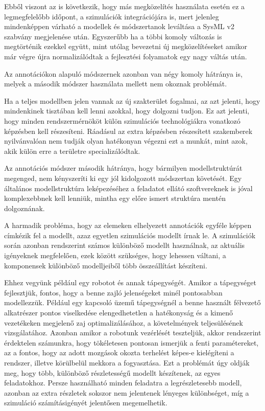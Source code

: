         Ebből viszont az is következik, hogy más megközelítés használata esetén ez a legmegfelelőbb időpont, a szimulációk integrációjára is, mert jelenleg mindenképpen várható a modellek és módszertanok leváltása a SysML v2 szabvány megjelenése után.
        Egyszerűbb ha a többi komoly változás is megtörténik ezekkel együtt, mint utólag bevezetni új megközelítéseket amikor már végre újra normalizálódtak a fejlesztési folyamatok egy nagy váltás után.
        
        Az annotációkon alapuló módszernek azonban van négy komoly hátránya is, melyek a második módszer használata mellett nem okoznak problémát.

        Ha a teljes modellben jelen vannak az új szakterület fogalmai, az azt jelenti, hogy mindenkinek tisztában kell lenni azokkal, hogy dolgozni tudjon.
        Ez azt jelenti, hogy minden rendszermérnököt külön szimulációs technológiákra vonatkozó képzésben kell részesíteni.
        Ráadásul az extra képzésben részesített szakemberek nyilvánvalóan nem tudják olyan hatékonyan végezni ezt a munkát, mint azok, akik külön erre a területre specializálódtak.

        Az annotációs módszer második hátránya, hogy bármilyen modellstruktúrát megenged, nem kényszeríti ki egy jól kidolgozott módszertan követését.
        Egy általános modellstruktúra leképezéséhez a feladatot ellátó szoftvereknek is jóval komplexebbnek kell lenniük, mintha egy előre ismert struktúra mentén dolgoznának.

        A harmadik probléma, hogy az elemeken elhelyezett annotációk egyféle képpen címkézik fel a modellt, azaz egyetlen szimulációs modellt írnak le.
        A szimulációk során azonban rendszerint számos különböző modellt használnak, az aktuális igényeknek megfelelően, ezek között szükséges, hogy lehessen váltani, a komponensek különböző modelljeiből több összeállítást készíteni.
        
        Ehhez vegyünk például egy robotot és annak tápegységét.
        Amikor a tápegységet fejlesztjük, fontos, hogy a benne zajló jelenségeket minél pontosabban modellezzük. Például egy kapcsoló üzemű tápegységnél a benne használt félvezető alkatrészer pontos viselkedése elengedhetetlen a hatékonyság és a kimenő vezetékeken megjelenő zaj optimalizálásához, a követelmények teljesülésének vizsgálatához.
        Azonban amikor a robotunk vezérlését teszteljük, akkor rendszerint érdektelen számunkra, hogy tökéletesen pontosan ismerjük a fenti paramétereket, az a fontos, hogy az adott mozgások okozta terhelést képes-e kielégíteni a rendszer, illetve körülbelül mekkora a fogyasztása.
        Ezt a problémát úgy oldják meg, hogy több, különböző részletességű modellt készítenek, az egyes feladatokhoz.
        Persze használható minden feladatra a legrészletesebb modell, azonban az extra részletek sokszor nem jelentenek lényeges különbséget, míg a szimuláció számításigényét jelentősen megemelhetik.

